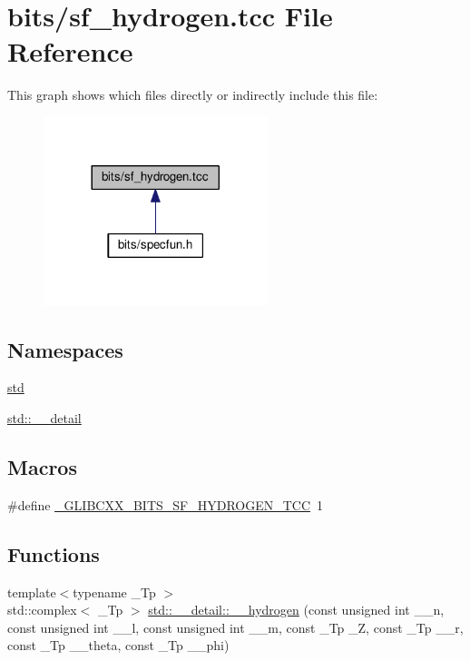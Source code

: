 \hypertarget{sf__hydrogen_8tcc}{}\section{bits/sf\+\_\+hydrogen.tcc File Reference}
\label{sf__hydrogen_8tcc}
This graph shows which files directly or indirectly include this file\+:
\nopagebreak
\begin{figure}[H]
\begin{center}
\leavevmode
\includegraphics[width=185pt]{sf__hydrogen_8tcc__dep__incl}
\end{center}
\end{figure}
\subsection*{Namespaces}
\begin{DoxyCompactItemize}
\item 
 \hyperlink{namespacestd}{std}
\item 
 \hyperlink{namespacestd_1_1____detail}{std\+::\+\_\+\+\_\+detail}
\end{DoxyCompactItemize}
\subsection*{Macros}
\begin{DoxyCompactItemize}
\item 
\#define \hyperlink{sf__hydrogen_8tcc_af6b60d2402ae885b7f3ef4519fb65ed9}{\+\_\+\+G\+L\+I\+B\+C\+X\+X\+\_\+\+B\+I\+T\+S\+\_\+\+S\+F\+\_\+\+H\+Y\+D\+R\+O\+G\+E\+N\+\_\+\+T\+CC}~1
\end{DoxyCompactItemize}
\subsection*{Functions}
\begin{DoxyCompactItemize}
\item 
{\footnotesize template$<$typename \+\_\+\+Tp $>$ }\\std\+::complex$<$ \+\_\+\+Tp $>$ \hyperlink{namespacestd_1_1____detail_af8bd1ad6980e19dce3ee9eb518bc90fa}{std\+::\+\_\+\+\_\+detail\+::\+\_\+\+\_\+hydrogen} (const unsigned int \+\_\+\+\_\+n, const unsigned int \+\_\+\+\_\+l, const unsigned int \+\_\+\+\_\+m, const \+\_\+\+Tp \+\_\+Z, const \+\_\+\+Tp \+\_\+\+\_\+r, const \+\_\+\+Tp \+\_\+\+\_\+theta, const \+\_\+\+Tp \+\_\+\+\_\+phi)
\end{DoxyCompactItemize}


